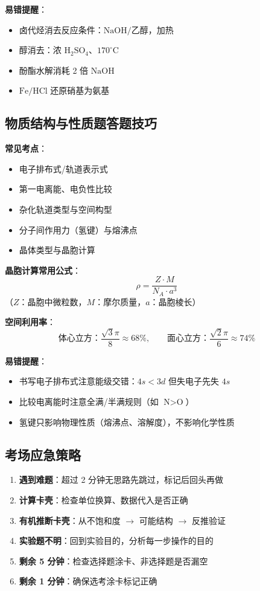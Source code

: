 \textbf{易错提醒}：
\begin{itemize}
  \item 卤代烃消去反应条件：$\text{NaOH}/\text{乙醇}$，加热
  \item 醇消去：浓 $\text{H}_2\text{SO}_4$、$170^\circ\text{C}$
  \item 酚酯水解消耗 2 倍 $\text{NaOH}$
  \item $\text{Fe/HCl}$ 还原硝基为氨基
\end{itemize}

\subsection{物质结构与性质题答题技巧}

\textbf{常见考点}：
\begin{itemize}
  \item 电子排布式/轨道表示式
  \item 第一电离能、电负性比较
  \item 杂化轨道类型与空间构型
  \item 分子间作用力（氢键）与熔沸点
  \item 晶体类型与晶胞计算
\end{itemize}

\textbf{晶胞计算常用公式}：
\[
\rho = \frac{Z \cdot M}{N_A \cdot a^3}
\]
（$Z$：晶胞中微粒数，$M$：摩尔质量，$a$：晶胞棱长）

\textbf{空间利用率}：
\[
\text{体心立方}：\frac{\sqrt{3}\pi}{8} \approx 68\%,\qquad
\text{面心立方}：\frac{\sqrt{2}\pi}{6} \approx 74\%
\]

\textbf{易错提醒}：
\begin{itemize}
  \item 书写电子排布式注意能级交错：$4s < 3d$ 但失电子先失 $4s$
  \item 比较电离能时注意全满/半满规则（如 $\text{N} > \text{O}$）
  \item 氢键只影响物理性质（熔沸点、溶解度），不影响化学性质
\end{itemize}

\subsection{考场应急策略}

\begin{enumerate}
  \item \textbf{遇到难题}：超过 2 分钟无思路先跳过，标记后回头再做
  \item \textbf{计算卡壳}：检查单位换算、数据代入是否正确
  \item \textbf{有机推断卡壳}：从不饱和度 $\to$ 可能结构 $\to$ 反推验证
  \item \textbf{实验题不明}：回到实验目的，分析每一步操作的目的
  \item \textbf{剩余 5 分钟}：检查选择题涂卡、非选择题是否漏空
  \item \textbf{剩余 1 分钟}：确保选考涂卡标记正确
\end{enumerate}
